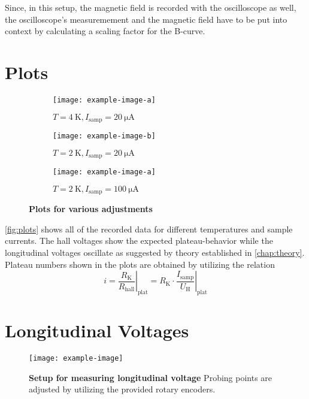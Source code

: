 Since, in this setup, the magnetic field is recorded with the oscilloscope as well, the oscilloscope's measuremement and the magnetic field have to be put into context by calculating a scaling factor for the B-curve.

\section{Plots}
\begin{figure}
	\centering
	\begin{subfigure}{.32\textwidth}
		\centering
		\texttt{[image: example-image-a]}
		\caption{$T=\SI{4}{\kelvin}, I_\text{samp} = \SI{20}{\micro\ampere}$}
	\end{subfigure}
	\hspace*{\fill}
	\begin{subfigure}{.32\textwidth}
		\centering
		\texttt{[image: example-image-b]}
		\caption{$T=\SI{2}{\kelvin}, I_\text{samp} = \SI{20}{\micro\ampere}$}
	\end{subfigure}
	\hspace*{\fill}
	\begin{subfigure}{.32\textwidth}
		\centering
		\texttt{[image: example-image-a]}
		\caption{$T=\SI{2}{\kelvin}, I_\text{samp} = \SI{100}{\micro\ampere}$}
	\end{subfigure}
	\caption[Plots for various adjustments]{\textbf{Plots for various adjustments}}
	\label{fig:plots}
\end{figure}
\autoref{fig:plots} shows all of the recorded data for different temperatures and sample currents.
The hall voltages show the expected plateau-behavior while the longitudinal voltages oscillate as suggested by theory established in \autoref{chap:theory}.
Plateau numbers shown in the plots are obtained by utilizing the relation
\begin{equation*}
	i = \left. \frac{R_\text{K}}{R_\text{hall}} \right\rvert_{\text{plat}} = R_\text{K}\cdot\left. \frac{I_\text{samp}}{U_\text{H}}\right\rvert_{\text{plat}}
\end{equation*}

\section{Longitudinal Voltages}
\begin{figure}
	\centering
	\texttt{[image: example-image]}
	\caption[Setup for measuring longitudinal voltage]{\textbf{Setup for measuring longitudinal voltage} Probing points are adjusted by utilizing the provided rotary encoders.}
	\label{fig:setup_long_don_jon}
\end{figure}

